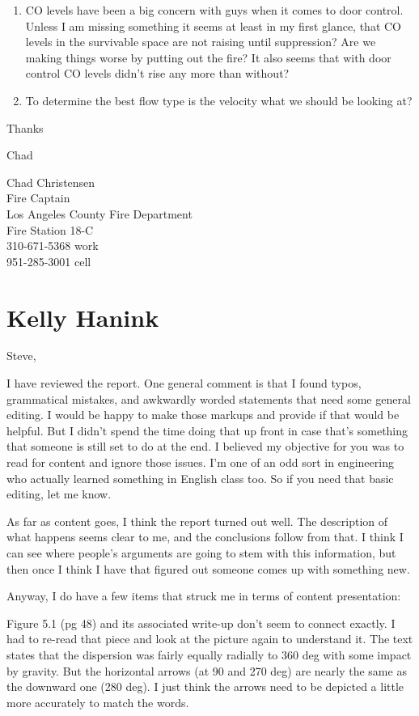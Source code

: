 \documentclass[12pt,oneside]{book}
\begin{document}
\begin{appendix}
\begin{enumerate}
\item CO levels have been a big concern with guys when it comes to door control. Unless I am missing something it seems at least in my first glance, that CO levels in the survivable space are not raising until suppression? Are we making things worse by putting out the fire? It also seems that with door control CO levels didn't rise any more than without?

\item To determine the best flow type is the velocity what we should be looking at?

\end{enumerate}
 
Thanks
 
Chad
 
Chad Christensen \\
Fire Captain \\
Los Angeles County Fire Department \\
Fire Station 18-C \\
310-671-5368 work \\
951-285-3001 cell \\

\section{Kelly Hanink}

Steve,
 
I have reviewed the report.  One general comment is that I found typos, grammatical mistakes, and awkwardly worded statements that need some general editing.  I would be happy to make those markups and provide if that would be helpful.  But I didn't spend the time doing that up front in case that's something that someone is still set to do at the end.  I believed my objective for you was to read for content and ignore those issues.  I'm one of an odd sort in engineering who actually learned something in English class too. So if you need that basic editing, let me know.
 
As far as content goes, I think the report turned out well.  The description of what happens seems clear to me, and the conclusions follow from that.  I think I can see where people's arguments are going to stem with this information, but then once I think I have that figured out someone comes up with something new.  
 
Anyway, I do have a few items that struck me in terms of content presentation:
 
Figure 5.1 (pg 48) and its associated write-up don't seem to connect exactly.  I had to re-read that piece and look at the picture again to understand it.  The text states that the dispersion was fairly equally radially to 360 deg with some impact by gravity.  But the horizontal arrows (at 90 and 270 deg) are nearly the same as the downward one (280 deg).  I just think the arrows need to be depicted a little more accurately to match the words.
 

\end{appendix}
\end{document}
